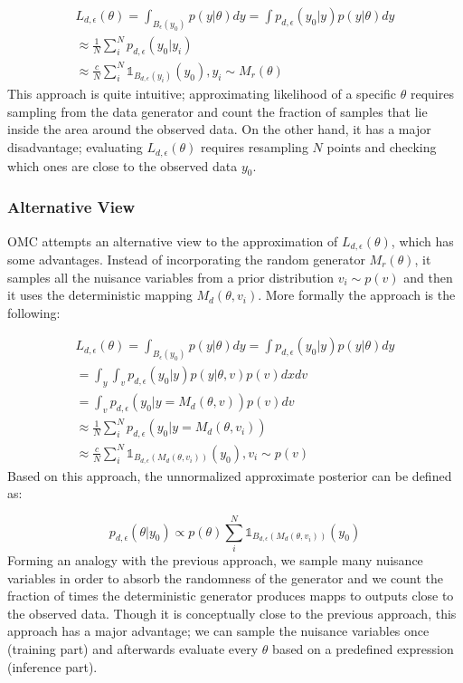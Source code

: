 \documentclass[11pt,twoside]{article}
\numberwithin{Theorem}{section}
\numberwithin{Definition}{section}
\numberwithin{Lemma}{section}
\numberwithin{Algorithm}{section}
\numberwithin{equation}{section}
\begin{document}
\begin{gather} \label{eq:primal_view}
  L_{d, \epsilon}(\theta)=\int_{B_\epsilon(y_0)}p(y|\theta)dy = \int p_{d,\epsilon}(y_0|y)p(y|\theta)dy\\
  \approx \frac{1}{N} \sum_i^N p_{d,\epsilon} (y_0|y_i) \\
  \approx \frac{c}{N} \sum_i^N \mathbb{1}_{B_{d,\epsilon}(y_i)} (y_0), y_i \sim M_r(\theta)
\end{gather}
%
This approach is quite intuitive; approximating likelihood of a specific $\theta$ requires sampling from the data generator and count the fraction of samples that lie inside the area around the observed data. On the other hand, it has a major disadvantage; evaluating $L_{d,\epsilon}(\theta)$ requires resampling $N$ points and checking which ones are close to the observed data $y_0$.

\subsubsection*{Alternative View}

OMC attempts an alternative view to the approximation of $L_{d,\epsilon}(\theta)$, which has some advantages. Instead of incorporating the random generator $M_r(\theta)$, it samples all the nuisance variables from a prior distribution $v_i \sim p(v)$ and then it uses the deterministic mapping $M_d(\theta, v_i)$. More formally the approach is the following:

\begin{gather} 
  L_{d,\epsilon}(\theta)=\int_{B_\epsilon(y_0)}p(y|\theta)dy = \int p_{d,\epsilon}(y_0|y)p(y|\theta)dy\\
  = \int_y \int_v p_{d,\epsilon}(y_0|y)p(y|\theta, v) p(v)dxdv \\
  = \int_v p_{d,\epsilon}(y_0|y=M_d(\theta, v)) p(v)dv \\
  \approx \frac{1}{N} \sum_i^N p_{d,\epsilon} (y_0|y=M_d(\theta, v_i)) \\
  \approx \frac{c}{N} \sum_i^N \mathbb{1}_{B_{d,\epsilon}(M_d(\theta, v_i))} (y_0), v_i \sim p(v)
  \label{eq:alt_view}
\end{gather}
%
Based on this approach, the unnormalized approximate posterior can be defined as:

\begin{equation}
  p_{d,\epsilon}(\theta|y_0) \propto p(\theta) \sum_i^N \mathbb{1}_{B_{d,\epsilon}(M_d(\theta, v_i))} (y_0)
  \end{equation}
%
Forming an analogy with the previous approach, we sample many nuisance variables in order to absorb the randomness of the generator and we count the fraction of times the deterministic generator produces mapps to outputs close to the observed data. Though it is conceptually close to the previous approach, this approach has a major advantage; we can sample the nuisance variables once (training part) and afterwards evaluate every $\theta$ based on a predefined expression (inference part).
\end{document}
